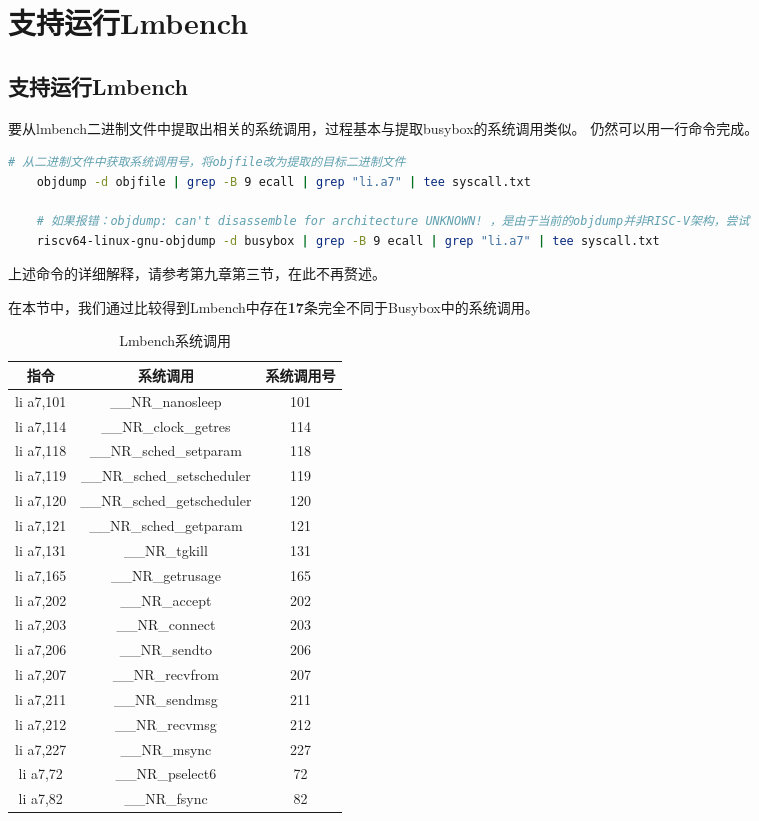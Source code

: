 \section{支持运行Lmbench}

\subsection{支持运行Lmbench}
要从lmbench二进制文件中提取出相关的系统调用，过程基本与提取busybox的系统调用类似。
仍然可以用一行命令完成。

\begin{lstlisting}[language=bash]
    # 从二进制文件中获取系统调用号，将objfile改为提取的目标二进制文件
    objdump -d objfile | grep -B 9 ecall | grep "li.a7" | tee syscall.txt

    # 如果报错：objdump: can't disassemble for architecture UNKNOWN! ，是由于当前的objdump并非RISC-V架构，尝试
    riscv64-linux-gnu-objdump -d busybox | grep -B 9 ecall | grep "li.a7" | tee syscall.txt

\end{lstlisting}

上述命令的详细解释，请参考第九章第三节，在此不再赘述。

在本节中，我们通过比较得到Lmbench中存在\textbf{17}条完全不同于Busybox中的系统调用。

\begin{table}[h]
\centering
\begin{tabular}{|c|c|c|}
\hline
\textbf{指令} & \textbf{系统调用} & \textbf{系统调用号} \\
\hline
li a7,101 & \_\_NR\_nanosleep & 101 \\
\hline
li a7,114 & \_\_NR\_clock\_getres & 114 \\
\hline
li a7,118 & \_\_NR\_sched\_setparam & 118 \\
\hline
li a7,119 & \_\_NR\_sched\_setscheduler & 119 \\
\hline
li a7,120 & \_\_NR\_sched\_getscheduler & 120 \\
\hline
li a7,121 & \_\_NR\_sched\_getparam & 121 \\
\hline
li a7,131 & \_\_NR\_tgkill & 131 \\
\hline
li a7,165 & \_\_NR\_getrusage & 165 \\
\hline
li a7,202 & \_\_NR\_accept & 202 \\
\hline
li a7,203 & \_\_NR\_connect & 203 \\
\hline
li a7,206 & \_\_NR\_sendto & 206 \\
\hline
li a7,207 & \_\_NR\_recvfrom & 207 \\
\hline
li a7,211 & \_\_NR\_sendmsg & 211 \\
\hline
li a7,212 & \_\_NR\_recvmsg & 212 \\
\hline
li a7,227 & \_\_NR\_msync & 227 \\
\hline
li a7,72 & \_\_NR\_pselect6 & 72 \\
\hline
li a7,82 & \_\_NR\_fsync & 82 \\
\hline
\end{tabular}
\caption{Lmbench系统调用}
\label{table:syscalls_compact}
\end{table}

